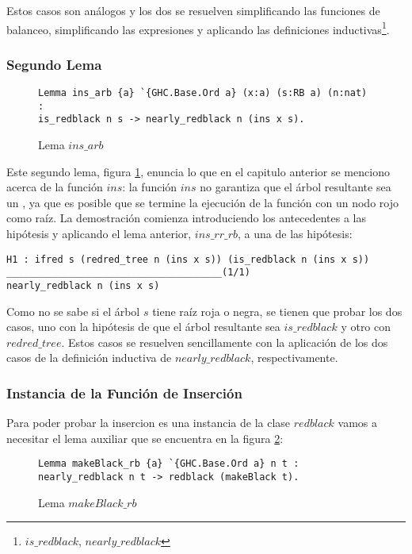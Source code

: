 Estos casos son análogos y los dos se resuelven simplificando las funciones de balanceo,
simplificando las expresiones y aplicando las definiciones inductivas\footnote{$is\_redblack$,
$nearly\_redblack$}.

\subsubsection{Segundo Lema}

\begin{figure}
\centering
\captionsetup{justification=centering}
\begin{verbatim}
Lemma ins_arb {a} `{GHC.Base.Ord a} (x:a) (s:RB a) (n:nat) :
is_redblack n s -> nearly_redblack n (ins x s).
\end{verbatim}
\caption{Lema $ins\_arb$}
\label{lema_2}
\end{figure}

Este segundo lema, figura \ref{lema_2}, enuncia lo que en el capitulo anterior se menciono acerca
de la funci\'on $ins$: la funci\'on $ins$ no garantiza que el \'arbol resultante sea un {\arn}, ya
que es posible que se termine la ejecuci\'on de la funci\'on con un nodo rojo como raíz. La
demostraci\'on comienza introduciendo los antecedentes a las hipótesis y aplicando el lema
anterior, $ins\_rr\_rb$, a una de las hip\'otesis:

\begin{verbatim}
H1 : ifred s (redred_tree n (ins x s)) (is_redblack n (ins x s))
______________________________________(1/1)
nearly_redblack n (ins x s)

\end{verbatim}

Como no se sabe si el \'arbol $s$ tiene ra\'iz roja o negra, se tienen que probar los dos casos,
uno con la hipótesis de que el \'arbol resultante sea $is\_redblack$ y otro con $redred\_tree$.
Estos casos se resuelven sencillamente con la aplicación de los dos casos de la definici\'on
inductiva de $nearly\_redblack$, respectivamente.

\subsubsection{Instancia de la Funci\'on de Inserci\'on}

Para poder probar la insercion es una instancia de la clase $redblack$ vamos a necesitar el
lema auxiliar que se encuentra en la figura \ref{lema_3}:
\begin{figure}
\centering
\captionsetup{justification=centering}
\begin{verbatim}
Lemma makeBlack_rb {a} `{GHC.Base.Ord a} n t :
nearly_redblack n t -> redblack (makeBlack t).
\end{verbatim}
\caption{Lema $makeBlack\_rb$}
\label{lema_3}
\end{figure}

